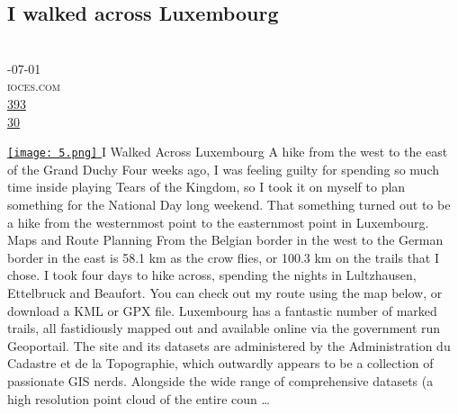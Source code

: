 \documentclass[10pt,a4paper]{article}
\begin{document}
\subsection{I walked across Luxembourg}
\noindent\begin{minipage}[t]{0.19\linewidth}
\vspace{0pt}
\noindent\scshape\footnotesize
\\ {\scriptsize\faCalendar}-07-01
\\ {\scriptsize\faGlobe}\space 
ioces.com
\\ {\scriptsize\faThumbsOUp}\space 
\href{http://news.ycombinator.com/item?id=37218841\&utm\_term=comment}{393} 
\\ {\scriptsize\faComments}\space 
\href{http://news.ycombinator.com/item?id=37218841\&utm\_term=comment}{30} 
\end{minipage} 
\begin{minipage}[t]{0.80\linewidth}
\vspace{0pt}
\begin{multicols}{2}
    \href{https://blog.ioces.com/matt/posts/i-walked-across-luxembourg/?utm\_source=hackernewsletter\&utm\_medium=email\&utm\_term=fav}{
        \texttt{[image: 5.png]}
    }
I Walked Across Luxembourg
A hike from the west to the east of the Grand Duchy
Four weeks ago, I was feeling guilty for spending so much time inside playing Tears of the Kingdom, so I took it on myself to plan something for the National Day long weekend. That something turned out to be a hike from the westernmost point to the easternmost point in Luxembourg.
Maps and Route Planning
From the Belgian border in the west to the German border in the east is 58.1 km as the crow flies, or 100.3 km on the trails that I chose. I took four days to hike across, spending the nights in Lultzhausen, Ettelbruck and Beaufort. You can check out my route using the map below, or download a KML or GPX file.
Luxembourg has a fantastic number of marked trails, all fastidiously mapped out and available online via the government run Geoportail. The site and its datasets are administered by the Administration du Cadastre et de la Topographie, which outwardly appears to be a collection of passionate GIS nerds. Alongside the wide range of comprehensive datasets (a high resolution point cloud of the entire coun
\dots
\end{multicols}
\end{minipage}
\par\medskip
\end{document}
